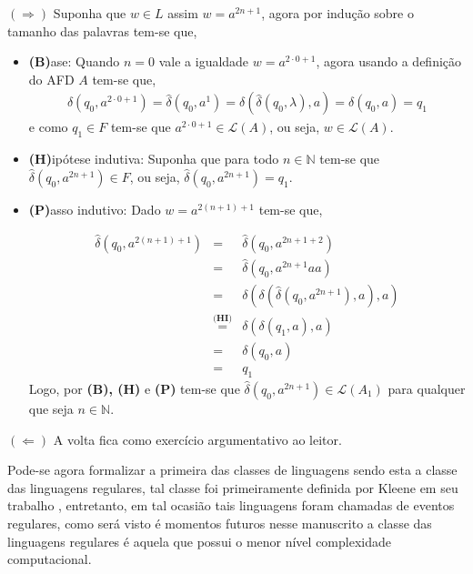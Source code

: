 \begin{prova}
  $(\Rightarrow)$ Suponha que $w \in L$ assim $w = a^{2n+1}$, agora por indução sobre o tamanho das palavras tem-se que, 
  
  \begin{itemize}
    \item[ ] \textbf{(B)}ase: Quando $n = 0$ vale a igualdade $w = a^{2\cdot 0+1}$, agora usando a definição do AFD $A$ tem-se que, 
    \begin{eqnarray*}
      \widehat{\delta}(q_0, a^{2\cdot 0+1}) = \widehat{\delta}(q_0, a^{1}) = \delta(\widehat{\delta}(q_0, \lambda), a) = \delta(q_0, a) = q_1
    \end{eqnarray*}
    e como $q_1 \in F$ tem-se que $a^{2\cdot 0+1} \in \mathcal{L}(A)$, ou seja, $w \in \mathcal{L}(A)$.
    
    \item[ ] \textbf{(H)}ipótese indutiva: Suponha que para todo $n \in \mathbb{N}$ tem-se que $\widehat{\delta}(q_0, a^{2n+1}) \in F$, ou seja, $\widehat{\delta}(q_0, a^{2n+1}) = q_1$.
    
    \item[ ] \textbf{(P)}asso indutivo: Dado $w = a^{2(n+1)+1}$ tem-se que,
    
    \begin{eqnarray*}
      \widehat{\delta}(q_0, a^{2(n+1)+1}) & = & \widehat{\delta}(q_0, a^{2n+1+2})\\
      & = & \widehat{\delta}(q_0, a^{2n+1}aa)\\
      & = & \delta(\delta(\widehat{\delta}(q_0, a^{2n+1}), a), a)\\
      & \stackrel{\textbf{(HI)}}{=} & \delta(\delta(q_1, a), a)\\
      & = & \delta(q_0, a)\\
      & = & q_1
    \end{eqnarray*}
    Logo, por \textbf{(B), (H)} e \textbf{(P)} tem-se que $\widehat{\delta}(q_0, a^{2n + 1}) \in \mathcal{L}(A_1)$ para qualquer que seja $n \in \mathbb{N}$. 
  \end{itemize}
  $(\Leftarrow)$ A volta fica como exercício argumentativo ao leitor.
\end{prova}

Pode-se agora formalizar a primeira das classes de linguagens sendo esta a classe das linguagens regulares, tal classe foi primeiramente definida por Kleene em seu trabalho \cite{kleene1951}, entretanto, em tal ocasião tais linguagens foram chamadas de eventos regulares, como será visto é momentos futuros nesse manuscrito a classe das linguagens regulares é aquela que possui o menor nível complexidade computacional.

